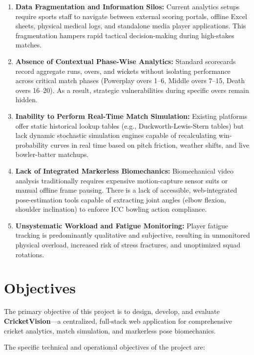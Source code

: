 \documentclass[12pt,a4paper]{report}
\begin{document}
\begin{enumerate}
    \item \textbf{Data Fragmentation and Information Silos:} Current analytics setups require sports staff to navigate between external scoring portals, offline Excel sheets, physical medical logs, and standalone media player applications. This fragmentation hampers rapid tactical decision-making during high-stakes matches.
    \item \textbf{Absence of Contextual Phase-Wise Analytics:} Standard scorecards record aggregate runs, overs, and wickets without isolating performance across critical match phases (Powerplay overs 1–6, Middle overs 7–15, Death overs 16–20). As a result, strategic vulnerabilities during specific overs remain hidden.
    \item \textbf{Inability to Perform Real-Time Match Simulation:} Existing platforms offer static historical lookup tables (e.g., Duckworth-Lewis-Stern tables) but lack dynamic stochastic simulation engines capable of recalculating win-probability curves in real time based on pitch friction, weather shifts, and live bowler-batter matchups.
    \item \textbf{Lack of Integrated Markerless Biomechanics:} Biomechanical video analysis traditionally requires expensive motion-capture sensor suits or manual offline frame pausing. There is a lack of accessible, web-integrated pose-estimation tools capable of extracting joint angles (elbow flexion, shoulder inclination) to enforce ICC bowling action compliance.
    \item \textbf{Unsystematic Workload and Fatigue Monitoring:} Player fatigue tracking is predominantly qualitative and subjective, resulting in unmonitored physical overload, increased risk of stress fractures, and unoptimized squad rotations.
\end{enumerate}

\section{Objectives}
The primary objective of this project is to design, develop, and evaluate \textbf{CricketVision}—a centralized, full-stack web application for comprehensive cricket analytics, match simulation, and markerless pose biomechanics.

The specific technical and operational objectives of the project are:
\end{document}
